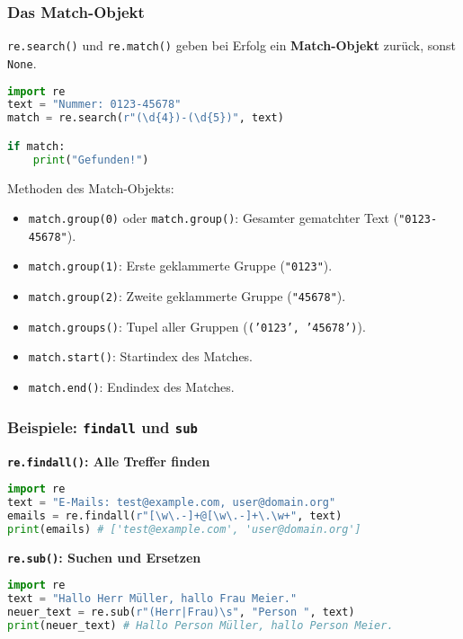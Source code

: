 \documentclass[aspectratio=169]{beamer} %
\begin{document}
\begin{frame}[fragile]
\frametitle{Das Match-Objekt}
\texttt{re.search()} und \texttt{re.match()} geben bei Erfolg ein \textbf{Match-Objekt} zurück, sonst \texttt{None}.
\begin{lstlisting}[language=Python]
import re
text = "Nummer: 0123-45678"
match = re.search(r"(\d{4})-(\d{5})", text)

if match:
    print("Gefunden!")
\end{lstlisting}
Methoden des Match-Objekts:
\begin{itemize}
    \item \texttt{match.group(0)} oder \texttt{match.group()}: Gesamter gematchter Text (\texttt{"0123-45678"}).
    \item \texttt{match.group(1)}: Erste geklammerte Gruppe (\texttt{"0123"}).
    \item \texttt{match.group(2)}: Zweite geklammerte Gruppe (\texttt{"45678"}).
    \item \texttt{match.groups()}: Tupel aller Gruppen (\texttt{('0123', '45678')}).
    \item \texttt{match.start()}: Startindex des Matches.
    \item \texttt{match.end()}: Endindex des Matches.
\end{itemize}
\end{frame}

\begin{frame}[fragile]
\frametitle{Beispiele: \texttt{findall} und \texttt{sub}}
\textbf{\texttt{re.findall()}: Alle Treffer finden}
\begin{lstlisting}[language=Python]
import re
text = "E-Mails: test@example.com, user@domain.org"
emails = re.findall(r"[\w\.-]+@[\w\.-]+\.\w+", text)
print(emails) # ['test@example.com', 'user@domain.org']
\end{lstlisting}
\vspace{1em}
\textbf{\texttt{re.sub()}: Suchen und Ersetzen}
\begin{lstlisting}[language=Python]
import re
text = "Hallo Herr Müller, hallo Frau Meier."
neuer_text = re.sub(r"(Herr|Frau)\s", "Person ", text)
print(neuer_text) # Hallo Person Müller, hallo Person Meier.
\end{lstlisting}
\end{frame}
\end{document}
